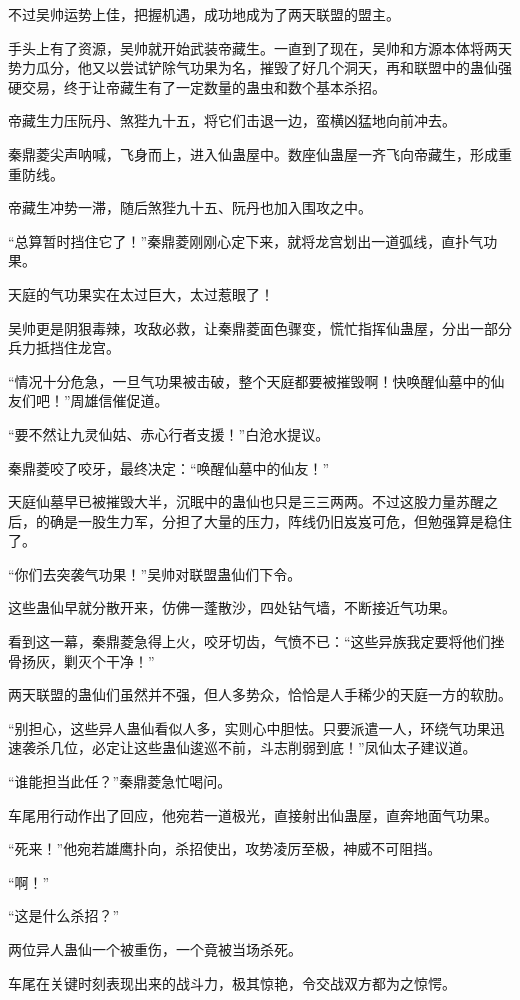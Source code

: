 \begin{this_body}
不过吴帅运势上佳，把握机遇，成功地成为了两天联盟的盟主。

手头上有了资源，吴帅就开始武装帝藏生。一直到了现在，吴帅和方源本体将两天势力瓜分，他又以尝试铲除气功果为名，摧毁了好几个洞天，再和联盟中的蛊仙强硬交易，终于让帝藏生有了一定数量的蛊虫和数个基本杀招。

帝藏生力压阮丹、煞狴九十五，将它们击退一边，蛮横凶猛地向前冲去。

秦鼎菱尖声呐喊，飞身而上，进入仙蛊屋中。数座仙蛊屋一齐飞向帝藏生，形成重重防线。

帝藏生冲势一滞，随后煞狴九十五、阮丹也加入围攻之中。

“总算暂时挡住它了！”秦鼎菱刚刚心定下来，就将龙宫划出一道弧线，直扑气功果。

天庭的气功果实在太过巨大，太过惹眼了！

吴帅更是阴狠毒辣，攻敌必救，让秦鼎菱面色骤变，慌忙指挥仙蛊屋，分出一部分兵力抵挡住龙宫。

“情况十分危急，一旦气功果被击破，整个天庭都要被摧毁啊！快唤醒仙墓中的仙友们吧！”周雄信催促道。

“要不然让九灵仙姑、赤心行者支援！”白沧水提议。

秦鼎菱咬了咬牙，最终决定：“唤醒仙墓中的仙友！”

天庭仙墓早已被摧毁大半，沉眠中的蛊仙也只是三三两两。不过这股力量苏醒之后，的确是一股生力军，分担了大量的压力，阵线仍旧岌岌可危，但勉强算是稳住了。

“你们去突袭气功果！”吴帅对联盟蛊仙们下令。

这些蛊仙早就分散开来，仿佛一蓬散沙，四处钻气墙，不断接近气功果。

看到这一幕，秦鼎菱急得上火，咬牙切齿，气愤不已：“这些异族我定要将他们挫骨扬灰，剿灭个干净！”

两天联盟的蛊仙们虽然并不强，但人多势众，恰恰是人手稀少的天庭一方的软肋。

“别担心，这些异人蛊仙看似人多，实则心中胆怯。只要派遣一人，环绕气功果迅速袭杀几位，必定让这些蛊仙逡巡不前，斗志削弱到底！”凤仙太子建议道。

“谁能担当此任？”秦鼎菱急忙喝问。

车尾用行动作出了回应，他宛若一道极光，直接射出仙蛊屋，直奔地面气功果。

“死来！”他宛若雄鹰扑向，杀招使出，攻势凌厉至极，神威不可阻挡。

“啊！”

“这是什么杀招？”

两位异人蛊仙一个被重伤，一个竟被当场杀死。

车尾在关键时刻表现出来的战斗力，极其惊艳，令交战双方都为之惊愕。


\end{this_body}
